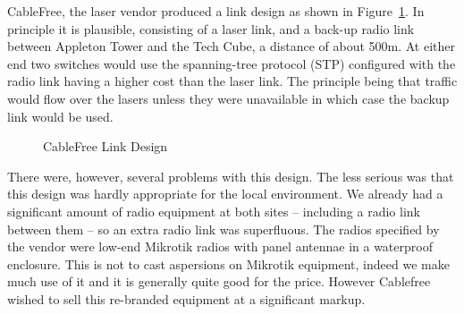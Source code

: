 CableFree, the laser vendor produced a link design as shown in
Figure~\ref{fig:cablefree-link}. In principle it is plausible,
consisting of a laser link, and a back-up radio link between Appleton
Tower and the Tech Cube, a distance of about 500m. At either end two
switches would use the spanning-tree protocol (STP) configured with the
radio link having a higher cost than the laser link. The principle
being that traffic would flow over the lasers unless they were
unavailable in which case the backup link would be used.
\def\cfdesign{%
    \node[draw,rotate=90] (atnetgear) at (0,0) {Netgear Switch};
    \node[draw] (atlaser) at (2,1) {Laser};
    \node[draw] (atradio) at (2,-1) {Radio};
    \node[draw] (tclaser) at (6,1) {Laser};
    \node[draw] (tcradio) at (6,-1) {Radio};
    \node[draw,rotate=-90] (tcnetgear) at (8,0) {Netgear Switch};
    \draw[thick,blue] (-1,0) edge (atnetgear.north);
    \draw[thick,blue] (9,0) edge (tcnetgear.north);
    \draw[thick,orange] (atnetgear.south) edge (atlaser.west);
    \draw[thick,orange] (tcnetgear.south) edge (tclaser.east);
    \draw[thick,blue] (atnetgear.south) edge (atradio.west);
    \draw[thick,blue] (tcnetgear.south) edge (tcradio.east);
    \draw[thick,red,dotted] (atlaser.east) edge (tclaser.west);
    \draw[thick,black,dotted] (atradio.east) edge (tcradio.west);
    \node at(4,0) {$\approx 500\text{m}$};
    \node at(4,1.5) {$\text{cost} = 1000$};
    \node at(4,-1.5) {$\text{cost} = 100000$};
}
\begin{figure}[h]
  \centering
  \caption{CableFree Link Design}
  \label{fig:cablefree-link}
\end{figure}

There were, however, several problems with this design. The less
serious was that this design was hardly appropriate for the local
environment. We already had a significant amount of radio equipment at
both sites -- including a radio link between them -- so an extra radio
link was superfluous. The radios specified by the vendor were low-end
Mikrotik radios with panel antennae in a waterproof enclosure. This is
not to cast aspersions on Mikrotik equipment, indeed we make much use
of it and it is generally quite good for the price. However Cablefree
wished to sell this re-branded equipment at a significant markup.

